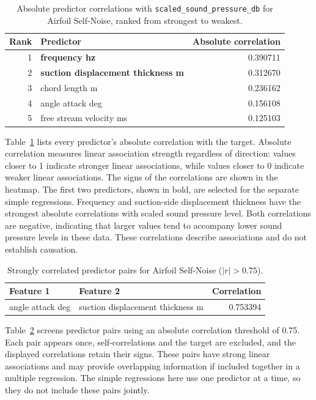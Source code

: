 \documentclass{article}
\begin{document}
\begin{table}[H]
\centering
\small
\begin{tabular}{rlr}
\toprule
Rank & Predictor & Absolute correlation \\
\midrule
1 & \textbf{frequency hz} & 0.390711 \\
2 & \textbf{suction displacement thickness m} & 0.312670 \\
3 & chord length m & 0.236162 \\
4 & angle attack deg & 0.156108 \\
5 & free stream velocity ms & 0.125103 \\
\bottomrule
\end{tabular}
\caption{Absolute predictor correlations with \texttt{scaled\_sound\_pressure\_db} for Airfoil Self-Noise, ranked from strongest to weakest.}
\label{tab:airfoil_target_corr}
\end{table}

Table~\ref{tab:airfoil_target_corr} lists every predictor's absolute correlation with the target. Absolute correlation measures linear association strength regardless of direction: values closer to 1 indicate stronger linear associations, while values closer to 0 indicate weaker linear associations. The signs of the correlations are shown in the heatmap. The first two predictors, shown in bold, are selected for the separate simple regressions. Frequency and suction-side displacement thickness have the strongest absolute correlations with scaled sound pressure level. Both correlations are negative, indicating that larger values tend to accompany lower sound pressure levels in these data. These correlations describe associations and do not establish causation.

\begin{table}[H]
\centering
\small
\begin{tabular}{llr}
\toprule
Feature 1 & Feature 2 & Correlation \\
\midrule
angle attack deg & suction displacement thickness m & 0.753394 \\
\bottomrule
\end{tabular}
\caption{Strongly correlated predictor pairs for Airfoil Self-Noise ($|r| > 0.75$).}
\label{tab:airfoil_predictor_pairs}
\end{table}

Table~\ref{tab:airfoil_predictor_pairs} screens predictor pairs using an absolute correlation threshold of 0.75. Each pair appears once, self-correlations and the target are excluded, and the displayed correlations retain their signs. These pairs have strong linear associations and may provide overlapping information if included together in a multiple regression. The simple regressions here use one predictor at a time, so they do not include these pairs jointly.
\end{document}
